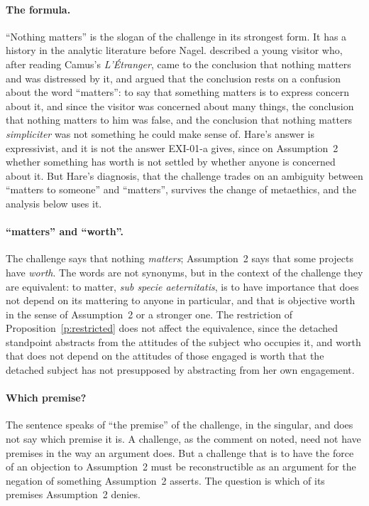 \paragraph{The formula.} \enquote{Nothing matters} is the slogan of the challenge in its strongest form. It has a history in the analytic literature before Nagel. \citet{Hare1972} described a young visitor who, after reading Camus's \emph{L'\'Etranger}, came to the conclusion that nothing matters and was distressed by it, and argued that the conclusion rests on a confusion about the word \enquote{matters}: to say that something matters is to express concern about it, and since the visitor was concerned about many things, the conclusion that nothing matters to him was false, and the conclusion that nothing matters \emph{simpliciter} was not something he could make sense of. Hare's answer is expressivist, and it is not the answer EXI-01-a gives, since on Assumption~2 whether something has worth is not settled by whether anyone is concerned about it. But Hare's diagnosis, that the challenge trades on an ambiguity between \enquote{matters to someone} and \enquote{matters}, survives the change of metaethics, and the analysis below uses it.

\paragraph{\enquote{matters} and \enquote{worth}.} The challenge says that nothing \emph{matters}; Assumption~2 says that some projects have \emph{worth}. The words are not synonyms, but in the context of the challenge they are equivalent: to matter, \emph{sub specie aeternitatis}, is to have importance that does not depend on its mattering to anyone in particular, and that is objective worth in the sense of Assumption~2 or a stronger one. The restriction of Proposition~\ref{p:restricted} does not affect the equivalence, since the detached standpoint abstracts from the attitudes of the subject who occupies it, and worth that does not depend on the attitudes of those engaged is worth that the detached subject has not presupposed by abstracting from her own engagement.


\paragraph{Which premise?} The sentence speaks of \enquote{the premise} of the challenge, in the singular, and does not say which premise it is. A challenge, as the comment on  noted, need not have premises in the way an argument does. But a challenge that is to have the force of an objection to Assumption~2 must be reconstructible as an argument for the negation of something Assumption~2 asserts. The question is which of its premises Assumption~2 denies.

